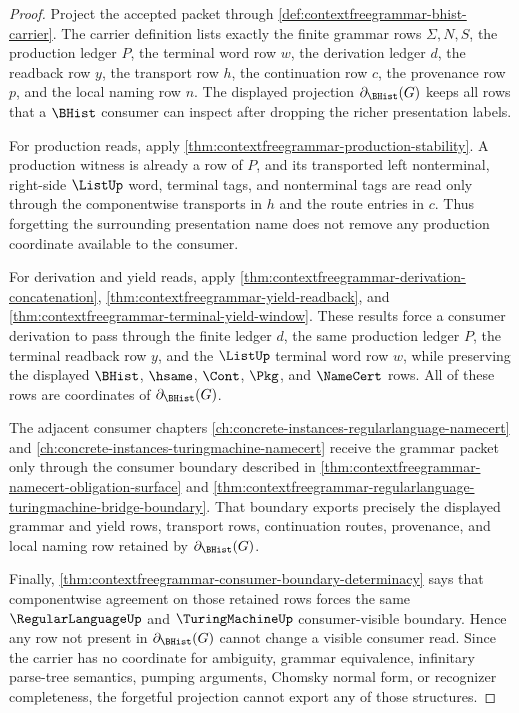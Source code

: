 \begin{proof}
Project the accepted packet through
\autoref{def:contextfreegrammar-bhist-carrier}. The carrier definition lists
exactly the finite grammar rows $\Sigma,N,S$, the production ledger $P$, the
terminal word row $w$, the derivation ledger $d$, the readback row $y$, the
transport row $h$, the continuation row $c$, the provenance row $p$, and the
local naming row $n$. The displayed projection $\partial_{\BHist}(G)$ keeps
all rows that a $\BHist$ consumer can inspect after dropping the richer
presentation labels.

For production reads, apply
\autoref{thm:contextfreegrammar-production-stability}. A production witness is
already a row of $P$, and its transported left nonterminal, right-side
$\ListUp$ word, terminal tags, and nonterminal tags are read only through the
componentwise transports in $h$ and the route entries in $c$. Thus forgetting
the surrounding presentation name does not remove any production coordinate
available to the consumer.

For derivation and yield reads, apply
\autoref{thm:contextfreegrammar-derivation-concatenation},
\autoref{thm:contextfreegrammar-yield-readback}, and
\autoref{thm:contextfreegrammar-terminal-yield-window}. These results force a
consumer derivation to pass through the finite ledger $d$, the same production
ledger $P$, the terminal readback row $y$, and the $\ListUp$ terminal word row
$w$, while preserving the displayed $\BHist$, $\hsame$, $\Cont$, $\Pkg$, and
$\NameCert$ rows. All of these rows are coordinates of
$\partial_{\BHist}(G)$.

The adjacent consumer chapters
\autoref{ch:concrete-instances-regularlanguage-namecert} and
\autoref{ch:concrete-instances-turingmachine-namecert} receive the grammar
packet only through the consumer boundary described in
\autoref{thm:contextfreegrammar-namecert-obligation-surface} and
\autoref{thm:contextfreegrammar-regularlanguage-turingmachine-bridge-boundary}.
That boundary exports precisely the displayed grammar and yield rows,
transport rows, continuation routes, provenance, and local naming row retained
by $\partial_{\BHist}(G)$.

Finally, \autoref{thm:contextfreegrammar-consumer-boundary-determinacy} says
that componentwise agreement on those retained rows forces the same
$\RegularLanguageUp$ and $\TuringMachineUp$ consumer-visible boundary. Hence
any row not present in $\partial_{\BHist}(G)$ cannot change a visible consumer
read. Since the carrier has no coordinate for ambiguity, grammar equivalence,
infinitary parse-tree semantics, pumping arguments, Chomsky normal form, or
recognizer completeness, the forgetful projection cannot export any of those
structures.
\end{proof}

